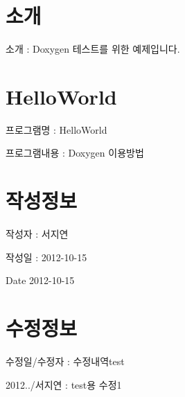 \hypertarget{index_소개}{}\section{소개}\label{index_소개}

\begin{DoxyItemize}
\item 소개 \-: Doxygen 테스트를 위한 예제입니다. 
\end{DoxyItemize}\hypertarget{index_HelloWorld}{}\section{Hello\-World}\label{index_HelloWorld}

\begin{DoxyItemize}
\item 프로그램명 \-: Hello\-World
\item 프로그램내용 \-: Doxygen 이용방법 
\end{DoxyItemize}\hypertarget{index_작성정보}{}\section{작성정보}\label{index_작성정보}

\begin{DoxyItemize}
\item 작성자 \-: 서지연
\item 작성일 \-: 2012-\/10-\/15 \begin{DoxyDate}{Date}
2012-\/10-\/15 
\end{DoxyDate}

\end{DoxyItemize}\hypertarget{index_수정정보}{}\section{수정정보}\label{index_수정정보}

\begin{DoxyItemize}
\item 수정일/수정자 \-: 수정내역test
\item 2012../서지연 \-: test용 수정1 
\end{DoxyItemize}